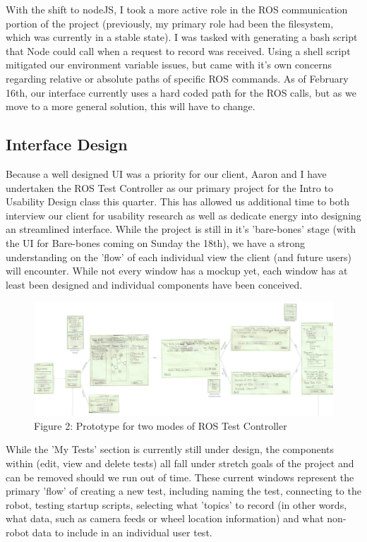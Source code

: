 \documentclass[onecolumn, draftclsnofoot,10pt, compsoc]{IEEEtran}
\begin{document}
With the shift to nodeJS, I took a more active role in the ROS communication portion of the project (previously, my primary role had been the filesystem, which was currently in a stable state). I was tasked with generating a bash script that Node could call when a request to record was received. Using a shell script mitigated our environment variable issues, but came with it's own concerns regarding relative or absolute paths of specific ROS commands. As of February 16th, our interface currently uses a hard coded path for the ROS calls, but as we move to a more general solution, this will have to change. 

\subsection{Interface Design}
Because a well designed UI was a priority for our client, Aaron and I have undertaken the ROS Test Controller as our primary project for the Intro to Usability Design class this quarter. This has allowed us additional time to both interview our client for usability research as well as dedicate energy into designing an streamlined interface. While the project is still in it's 'bare-bones' stage (with the UI for Bare-bones coming on Sunday the 18th), we have a strong understanding on the 'flow' of each individual view the client (and future users) will encounter. While not every window has a mockup yet, each window has at least been designed and individual components have been conceived. 

\begin{figure}[H]
	\centering
	\includegraphics[scale=0.25]{Prototype.eps}
	\caption{Figure 2: Prototype for two modes of ROS Test Controller}
\end{figure}

While the 'My Tests' section is currently still under design, the components within (edit, view and delete tests) all fall under stretch goals of the project and can be removed should we run out of time. These current windows represent the primary 'flow' of creating a new test, including naming the test, connecting to the robot, testing startup scripts, selecting what 'topics' to record (in other words, what data, such as camera feeds or wheel location information) and what non-robot data to include in an individual user test.
\end{document}
